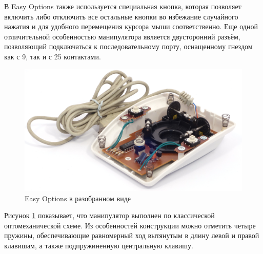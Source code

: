 \documentclass[11pt, a4paper]{article}
\begin{document}
В Easy Options также используется специальная кнопка, которая позволяет включить либо отключить все остальные кнопки во избежание случайного нажатия и для удобного перемещения курсора мыши соответственно. Еще одной отличительной особенностью манипулятора является двусторонний разъём, позволяющий подключаться к последовательному порту, оснащенному гнездом как с 9, так и с 25 контактами.

\begin{figure}[h]
    \centering
    \includegraphics[scale=0.6]{1993_easy_options_trackball/inside_60.jpg}
    \caption{Easy Options в разобранном виде}
    \label{fig:EasyOptionsInside}
\end{figure}

Рисунок \ref{fig:EasyOptionsInside} показывает, что манипулятор выполнен по классической оптомеханической схеме. Из особенностей конструкции можно отметить четыре пружины, обеспечивающие равномерный ход вытянутым в длину левой и правой клавишам, а также подпружиненную центральную клавишу.
\end{document}
